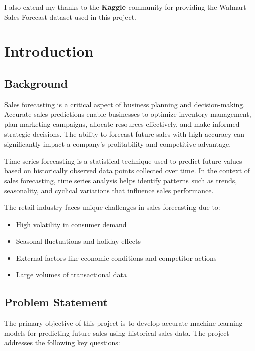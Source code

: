 \documentclass[12pt,a4paper]{report}
\begin{document}
I also extend my thanks to the \textbf{Kaggle} community for providing the Walmart Sales Forecast dataset used in this project.

\tableofcontents
\newpage

\listoffigures
{}

\listoftables
{}

\chapter{Introduction}
\label{ch:introduction}

\section{Background}
\label{sec:background}
Sales forecasting is a critical aspect of business planning and decision-making. Accurate sales predictions enable businesses to optimize inventory management, plan marketing campaigns, allocate resources effectively, and make informed strategic decisions. The ability to forecast future sales with high accuracy can significantly impact a company's profitability and competitive advantage.

Time series forecasting is a statistical technique used to predict future values based on historically observed data points collected over time. In the context of sales forecasting, time series analysis helps identify patterns such as trends, seasonality, and cyclical variations that influence sales performance.

The retail industry faces unique challenges in sales forecasting due to:
\begin{itemize}
    \item High volatility in consumer demand
    \item Seasonal fluctuations and holiday effects
    \item External factors like economic conditions and competitor actions
    \item Large volumes of transactional data
\end{itemize}

\section{Problem Statement}
\label{sec:problem}
The primary objective of this project is to develop accurate machine learning models for predicting future sales using historical sales data. The project addresses the following key questions:
\end{document}
